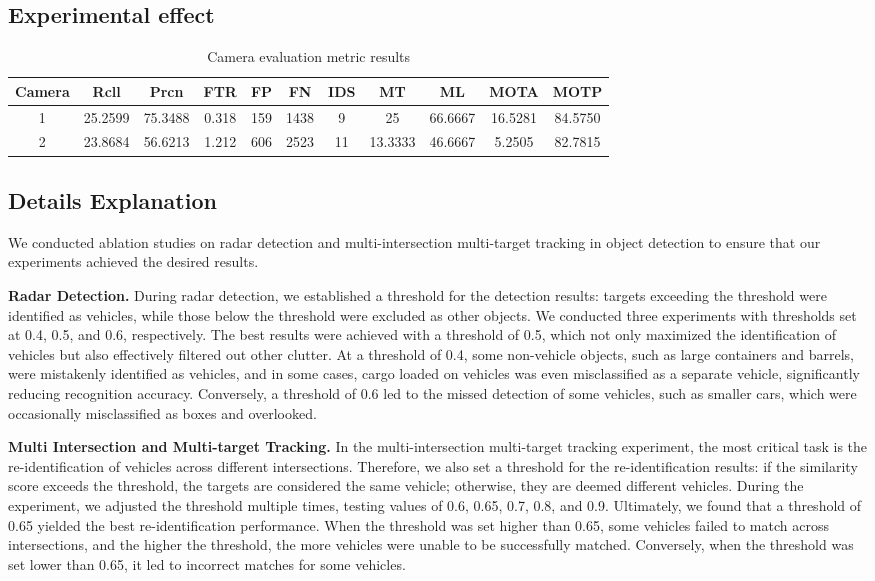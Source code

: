 \subsection{Experimental effect}

\begin{table*}[t] 
	\centering
	\caption{Camera evaluation metric results}
	\label{tab:example}
	\begin{tabular}{ccccccccccc}
		\toprule
		Camera & Rcll & Prcn & FTR & FP & FN & IDS & MT & ML & MOTA & MOTP\\
		\midrule
		1 & 25.2599 & 75.3488 & 0.318 & 159 & 1438 & 9 & 25 & 66.6667 & 16.5281 & 84.5750\\
		2 & 23.8684 & 56.6213 & 1.212 & 606 & 2523 & 11 & 13.3333 & 46.6667 & 5.2505 & 82.7815\\
		\bottomrule
	\end{tabular}
\end{table*}

\subsection{Details Explanation}

We conducted ablation studies on radar detection and multi-intersection multi-target tracking in object detection to ensure that our experiments achieved the desired results.

\textbf{Radar Detection.}
During radar detection, we established a threshold for the detection results: targets exceeding the threshold were identified as vehicles, while those below the threshold were excluded as other objects. 
We conducted three experiments with thresholds set at 0.4, 0.5, and 0.6, respectively. 
The best results were achieved with a threshold of 0.5, which not only maximized the identification of vehicles but also effectively filtered out other clutter. 
At a threshold of 0.4, some non-vehicle objects, such as large containers and barrels, were mistakenly identified as vehicles, and in some cases, cargo loaded on vehicles was even misclassified as a separate vehicle, significantly reducing recognition accuracy. 
Conversely, a threshold of 0.6 led to the missed detection of some vehicles, such as smaller cars, which were occasionally misclassified as boxes and overlooked.

\textbf{Multi Intersection and Multi-target Tracking.}
In the multi-intersection multi-target tracking experiment, the most critical task is the re-identification of vehicles across different intersections. 
Therefore, we also set a threshold for the re-identification results: if the similarity score exceeds the threshold, the targets are considered the same vehicle; otherwise, they are deemed different vehicles. 
During the experiment, we adjusted the threshold multiple times, testing values of 0.6, 0.65, 0.7, 0.8, and 0.9. 
Ultimately, we found that a threshold of 0.65 yielded the best re-identification performance. 
When the threshold was set higher than 0.65, some vehicles failed to match across intersections, and the higher the threshold, the more vehicles were unable to be successfully matched. 
Conversely, when the threshold was set lower than 0.65, it led to incorrect matches for some vehicles.

